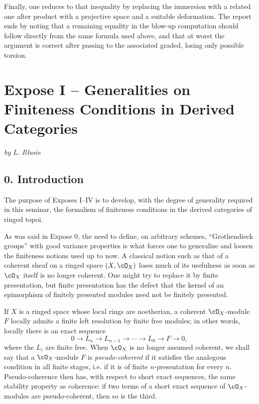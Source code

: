 \documentclass[11pt]{article}
\theoremstyle{plain}
\theoremstyle{definition}
\theoremstyle{remark}
\begin{document}
Finally, one reduces to that inequality by replacing the immersion with a related one after product with a projective space and a suitable deformation. The report ends by noting that a remaining equality in the blow-up computation should follow directly from the same formula used above, and that at worst the argument is correct after passing to the associated graded, losing only possible torsion.

\clearpage
\section{Expose I -- Generalities on Finiteness Conditions in Derived Categories}
\begin{center}
\emph{by L. Illusie}
\end{center}

\subsection*{0. Introduction}

The purpose of Exposes I--IV is to develop, with the degree of generality required in this seminar, the formalism of finiteness conditions in the derived categories of ringed topoi.

As was said in Expose 0, the need to define, on arbitrary schemes, ``Grothendieck groups'' with good variance properties is what forces one to generalize and loosen the finiteness notions used up to now. A classical notion such as that of a coherent sheaf on a ringed space $(X,\cO_X)$ loses much of its usefulness as soon as $\cO_X$ itself is no longer coherent. One might try to replace it by finite presentation, but finite presentation has the defect that the kernel of an epimorphism of finitely presented modules need not be finitely presented.

If $X$ is a ringed space whose local rings are noetherian, a coherent $\cO_X$-module $F$ locally admits a finite left resolution by finite free modules; in other words, locally there is an exact sequence
\[
0\longrightarrow L_n\longrightarrow L_{n-1}\longrightarrow\cdots\longrightarrow L_0\longrightarrow F\longrightarrow0,
\]
where the $L_i$ are finite free. When $\cO_X$ is no longer assumed coherent, we shall say that a $\cO_X$-module $F$ is \emph{pseudo-coherent} if it satisfies the analogous condition in all finite stages, i.e. if it is of finite $n$-presentation for every $n$. Pseudo-coherence then has, with respect to short exact sequences, the same stability property as coherence: if two terms of a short exact sequence of $\cO_X$-modules are pseudo-coherent, then so is the third.
\end{document}
